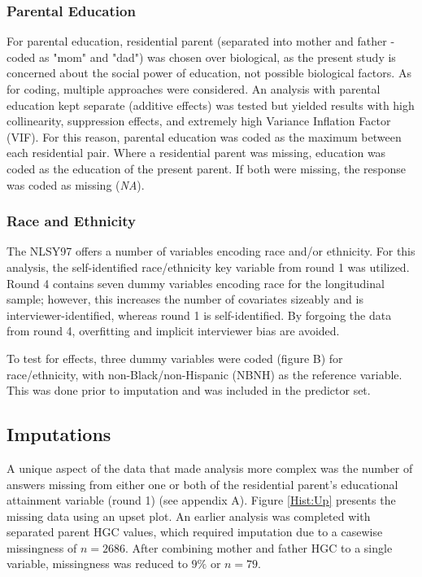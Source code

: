 \documentclass[jou,12pt,floatsintext]{apa7}
\begin{document}
\subsubsection{Parental Education}

For parental education, residential parent (separated into mother and father - coded as "mom" and "dad") was chosen over biological, as the present study is concerned about the social power of education, not possible biological factors. As for coding, multiple approaches were considered. An analysis with parental education kept separate (additive effects) was tested but yielded results with high collinearity, suppression effects, and extremely high Variance Inflation Factor (VIF). For this reason, parental education was coded as the maximum between each residential pair. Where a residential parent was missing, education was coded as the education of the present parent. If both were missing, the response was coded as missing (\textit{NA}).

\subsubsection{Race and Ethnicity}
The NLSY97 offers a number of variables encoding race and/or ethnicity. For this analysis, the self-identified race/ethnicity key variable from round 1 was utilized. Round 4 contains seven dummy variables encoding race for the longitudinal sample; however, this increases the number of covariates sizeably and is interviewer-identified, whereas round 1 is self-identified. By forgoing the data from round 4, overfitting and implicit interviewer bias are avoided.

To test for effects, three dummy variables were coded (figure B) for race/ethnicity, with non-Black/non-Hispanic (NBNH) as the reference variable. This was done prior to imputation and was included in the predictor set.

\subsection{Imputations}

A unique aspect of the data that made analysis more complex was the number of answers missing from either one or both of the residential parent's educational attainment variable (round 1) (see appendix A). Figure \ref{Hist:Up} presents the missing data using an upset plot. An earlier analysis was completed with separated parent HGC values, which required imputation due to a casewise missingness of $\textit{n} = 2686$. After combining mother and father HGC to a single variable, missingness was reduced to $9\%$ or $\textit{n} = 79$.
\end{document}
